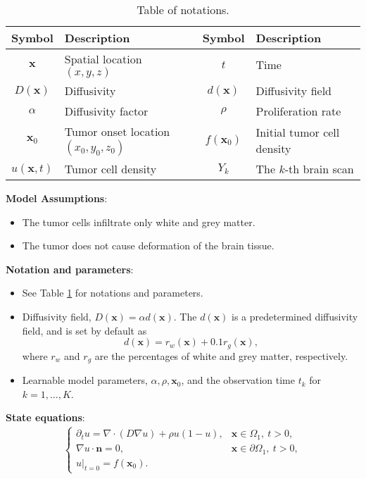 \documentclass[12pt]{article}
\newcommand{\bn}{\mathbf{n}}
\newcommand{\bx}{\mathbf{x}}
\newcommand{\pp}{\partial}
\begin{document}
\begin{table}[htbp]
    \centering
    \begin{tabular}{c|l|c|l}
        \toprule
        \textbf{Symbol} & \textbf{Description} & \textbf{Symbol} & \textbf{Description} \\
        \midrule
        $ \bx $ & Spatial location $(x,y,z)$ & $t$ & Time \\
        $ D(\bx) $ & Diffusivity & $d(\bx)$ & Diffusivity field \\
        $ \alpha $ & Diffusivity factor & $\rho$ & Proliferation rate \\
        $ \bx_0 $ & Tumor onset location $(x_0,y_0,z_0)$ & $f(\bx_0)$ & Initial tumor cell density \\
        $ u(\bx, t) $ & Tumor cell density & $Y_k$ & The $k$-th brain scan \\
        \bottomrule
    \end{tabular}
    \caption{Table of notations.}
    \label{tab:notations}
\end{table}

\noindent \textbf{Model Assumptions}:
\begin{itemize}[noitemsep,topsep=0pt,leftmargin=*]
\item The tumor cells infiltrate only white and grey matter.
\item The tumor does not cause deformation of the brain tissue.
\end{itemize}

\noindent\textbf{Notation and parameters}:
\begin{itemize}[leftmargin=*,noitemsep,topsep=0pt]
    \item See Table \ref{tab:notations} for notations and parameters.
    \item Diffusivity field, $D(\bx) = \alpha d(\bx)$. The $d(\bx)$ is a predetermined diffusivity field, and is set by default as
    \[ d(\bx) = r_w(\bx) + 0.1 r_g(\bx), \]
    where $r_w$ and $r_g$ are the percentages of white and grey matter, respectively.
    \item Learnable model parameters, $\alpha, \rho, \bx_0$, and the observation time $t_k$ for $k = 1, \ldots, K$.
\end{itemize}

\noindent\textbf{State equations}:
\begin{equation}
\begin{split}
\begin{cases}
    \pp_t u = \nabla \cdot (D \nabla u) + \rho u (1 - u), & \bx \in \Omega_1,\ t > 0, \\
    \nabla u \cdot \bn = 0, & \bx \in \pp\Omega_1,\ t > 0, \\
    u|_{t=0} = f(\bx_0). &
\end{cases}
\end{split}
\end{equation}
\end{document}
